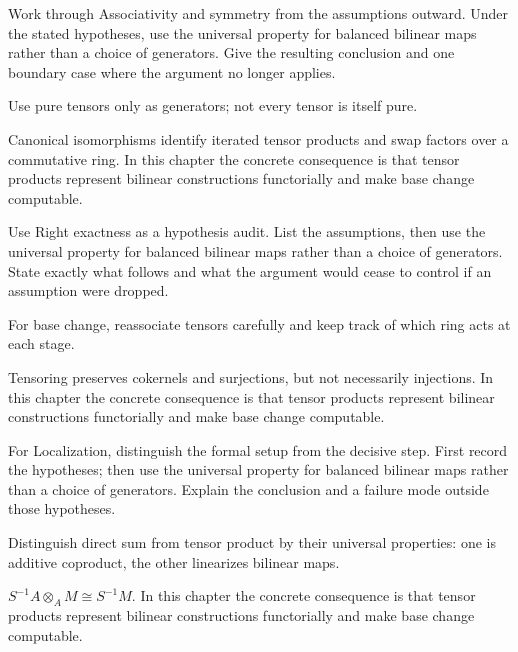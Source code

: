 \begin{exercise}\label{exr:v10-06}
Work through Associativity and symmetry from the assumptions outward. Under the stated hypotheses, use the universal property for balanced bilinear maps rather than a choice of generators. Give the resulting conclusion and one boundary case where the argument no longer applies.
\end{exercise}
\begin{hint}
Use pure tensors only as generators; not every tensor is itself pure.
\end{hint}
\begin{solution}
Canonical isomorphisms identify iterated tensor products and swap factors over a commutative ring. In this chapter the concrete consequence is that tensor products represent bilinear constructions functorially and make base change computable.
\end{solution}

\begin{exercise}\label{exr:v10-07}
Use Right exactness as a hypothesis audit. List the assumptions, then use the universal property for balanced bilinear maps rather than a choice of generators. State exactly what follows and what the argument would cease to control if an assumption were dropped.
\end{exercise}
\begin{hint}
For base change, reassociate tensors carefully and keep track of which ring acts at each stage.
\end{hint}
\begin{solution}
Tensoring preserves cokernels and surjections, but not necessarily injections. In this chapter the concrete consequence is that tensor products represent bilinear constructions functorially and make base change computable.
\end{solution}

\begin{exercise}\label{exr:v10-08}
For Localization, distinguish the formal setup from the decisive step. First record the hypotheses; then use the universal property for balanced bilinear maps rather than a choice of generators. Explain the conclusion and a failure mode outside those hypotheses.
\end{exercise}
\begin{hint}
Distinguish direct sum from tensor product by their universal properties: one is additive coproduct, the other linearizes bilinear maps.
\end{hint}
\begin{solution}
$S^{-1}A\otimes_A M\cong S^{-1}M$. In this chapter the concrete consequence is that tensor products represent bilinear constructions functorially and make base change computable.
\end{solution}

